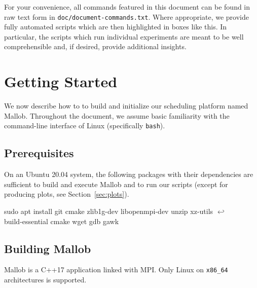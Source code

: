 \documentclass[runningheads]{article}
\newcommand{\CR}{{\tiny$\hookleftarrow$}}
\numberwithin{dummy}{subsection}
\begin{document}
\begin{tcolorbox}[
  colback=Magenta!5!white,
  colframe=Magenta!75!black,
  title={\centering Commands and Scripts}]
For your convenience, all commands featured in this document can be found in raw text form in \texttt{doc/document-commands.txt}.
Where appropriate, we provide fully automated scripts which are then highlighted in boxes like this.
In particular, the scripts which run individual experiments are meant to be well comprehensible and, if desired, provide additional insights.
\end{tcolorbox}





\section{Getting Started}

We now describe how to to build and initialize our scheduling platform named Mallob.
Throughout the document, we assume basic familiarity with the command-line interface of Linux (specifically \texttt{bash}).

\subsection{Prerequisites}
\label{sec:prerequisites}

On an Ubuntu 20.04 system, the following packages with their dependencies are sufficient to build and execute Mallob and to run our scripts (except for producing plots, see Section~\ref{sec:plots}).

\begin{ttfenv}
sudo apt install git cmake zlib1g-dev libopenmpi-dev unzip xz-utils \CR\\
build-essential cmake wget gdb gawk
\end{ttfenv}






\subsection{Building Mallob}

Mallob is a C++17 application linked with MPI. Only Linux on \texttt{x86\_64} architectures is supported.
\end{document}
